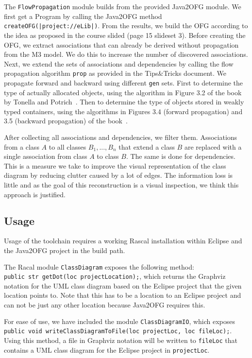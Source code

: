 \indent The \texttt{FlowPropagation} module builds from the provided Java2OFG module. 
We first get a Program by calling the Java2OFG method \texttt{createOFG(|project://eLib|)}. 
From the results, we build the OFG according to the idea as proposed in the course slided (page 15 slideset 3). 
Before creating the OFG, we extract associations that can already be derived without propagation from the M3 model. 
We do this to increase the number of discovered associations.  
Next, we extend the sets of associations and dependencies by calling the flow propagation algorithm \texttt{prop} 
as provided in the Tips\&Tricks document. 
We propagate forward and backward using different \texttt{gen} sets. 
First to determine the type of actually allocated objects, using the algorithm in Figure 3.2 of the book by Tonella and Potrich~\cite{rev-eng}.
Then to determine the type of objects stored in weakly typed containers, 
using the algorithms in Figures 3.4 (forward propagation) and 3.5 (backward propagation) of the book~\cite{rev-eng}.

After collecting all associations and dependencies, we filter them. 
Associations from a class $A$ to all classes $B_1, ... , B_n$ that extend a class $B$ 
are replaced with a single association from class $A$ to class $B$. The same is done for dependencies. 
This is a measure we take to improve the visual representation of the class diagram by reducing clutter caused by a lot of edges. 
The information loss is little and as the goal of this reconstruction is a visual inspection, we think this approach is justified.

\subsection{Usage}\label{usage}
	Usage of the toolchain requires a working Rascal installation within Eclipse and the Java2OFG project in the build path.

	The Racal module \texttt{ClassDiagram} exposes the following method:\\ \texttt{public str getDot(loc projectLocation);}, which returns the Graphviz notation for the UML class diagram based on the Eclipse project that the given location points to.
	Note that this has to be a location to an Eclipse project and can not be just any other location because Java2OFG requires this.

	For ease of use, we have included the module \texttt{ClassDiagramIO}, which exposes \texttt{public void writeClassDiagramToFile(loc projectLoc, loc fileLoc);}.
	Using this method, a file in Graphviz notation will be written to \texttt{fileLoc} that contains a UML class diagram for the Eclipse project in \texttt{projectLoc}.
	
